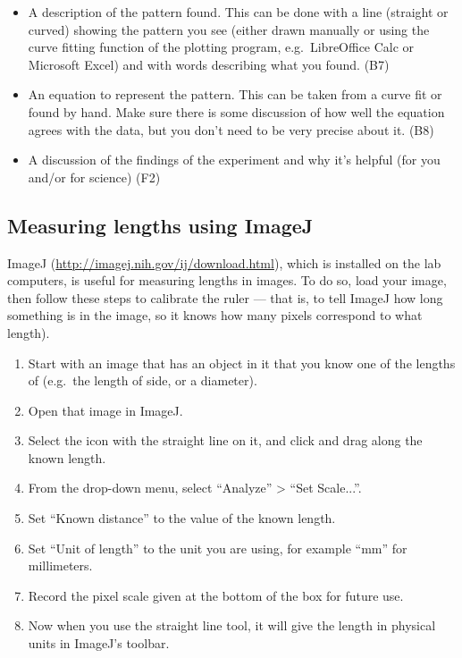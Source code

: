 \begin{enumerate}
\begin{itemize}
		\item A description of the pattern found. This can be done with a line (straight or curved) showing the pattern you see (either drawn manually or using the curve fitting function of the plotting program, e.g.\ LibreOffice Calc or Microsoft Excel) and with words describing what you found. (B7)
		
		\item An equation to represent the pattern. This can be taken from a curve fit or found by hand. Make sure there is some discussion of how well the equation agrees with the data, but you don't need to be very precise about it. (B8)
		
		\item A discussion of the findings of the experiment and why it's helpful (for you and/or for science) (F2)
	\end{itemize}

\end{enumerate}

\subsection{Measuring lengths using ImageJ}

ImageJ (\url{http://imagej.nih.gov/ij/download.html}), which is installed on the lab computers, is useful for measuring lengths in images. To do so, load your image, then follow these steps to calibrate the ruler --- that is, to tell ImageJ how long something is in the image, so it knows how many pixels correspond to what length).

\begin{enumerate}
	\item Start with an image that has an object in it that you know one of the lengths of (e.g.\ the length of side, or a diameter).
	
	\item Open that image in ImageJ.
	
	\item Select the icon with the straight line on it, and click and drag along the known length.
	
	\item From the drop-down menu, select ``Analyze'' > ``Set Scale...''.
	
	\item Set ``Known distance'' to the value of the known length.
	
	\item Set ``Unit of length'' to the unit you are using, for example ``mm'' for millimeters.
	
	\item Record the pixel scale given at the bottom of the box for future use.
	
	\item Now when you use the straight line tool, it will give the length in physical units in ImageJ's toolbar.
\end{enumerate}

